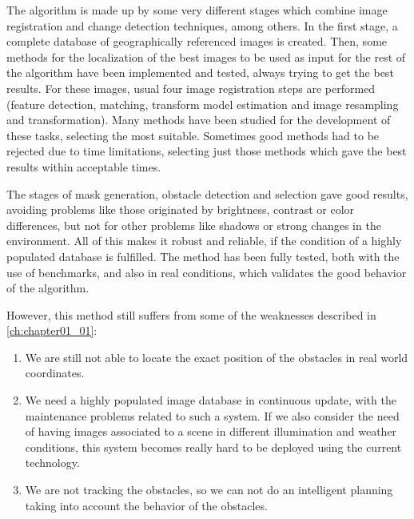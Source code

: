 The algorithm is made up by some very different stages which combine image registration and change detection techniques, among others. In the first stage, a complete database of geographically referenced images is created. Then, some methods for the localization of the best images to be used as input for the rest of the algorithm have been implemented and tested, always trying to get the best results. For these images, usual four image registration steps are performed (feature detection, matching, transform model estimation and image resampling and transformation). Many methods have been studied for the development of these tasks, selecting the most suitable. Sometimes good methods had to be rejected due to time limitations, selecting just those methods which gave the best results within acceptable times.

The stages of mask generation, obstacle detection and selection gave good results, avoiding problems like those originated by brightness, contrast or color differences, but not for other problems like shadows or strong changes in the environment. All of this makes it robust and reliable, if the condition of a highly populated database is fulfilled. The method has been fully tested, both with the use of benchmarks, and also in real conditions, which validates the good behavior of the algorithm.

However, this method still suffers from some of the weaknesses described in \ref{ch:chapter01_01}:
\begin{enumerate}
 \item We are still not able to locate the exact position of the obstacles in real world coordinates.
 \item We need a highly populated image database in continuous update, with the maintenance problems related to such a system. If we also consider the need of having images associated to a scene in different illumination and weather conditions, this system becomes really hard to be deployed using the current technology.
 \item We are not tracking the obstacles, so we can not do an intelligent planning taking into account the behavior of the obstacles. 
\end{enumerate}

